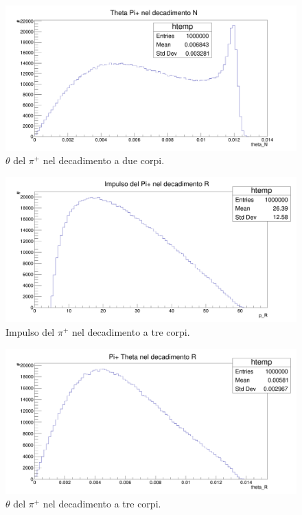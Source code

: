 \documentclass[8pt]{extarticle}
\begin{document}
\begin{figure}
\begin{center}
\includegraphics[scale=0.25]{gen_theta_N}
\caption{$\theta$ del $\pi^+$ nel decadimento a due corpi.}
\label{fig:gen_theta_N}
\end{center}
\end{figure}

\begin{figure}
\begin{center}
\includegraphics[scale=0.25]{gen_p_R}
\caption{Impulso del $\pi^+$ nel decadimento a tre corpi.}
\label{fig:gen_p_R}
\end{center}
\end{figure}

\begin{figure}
\begin{center}
\includegraphics[scale=0.25]{gen_theta_R}
\caption{$\theta$ del $\pi^+$ nel decadimento a tre corpi.}
\label{fig:gen_theta_R}
\end{center}
\end{figure}
\end{document}
